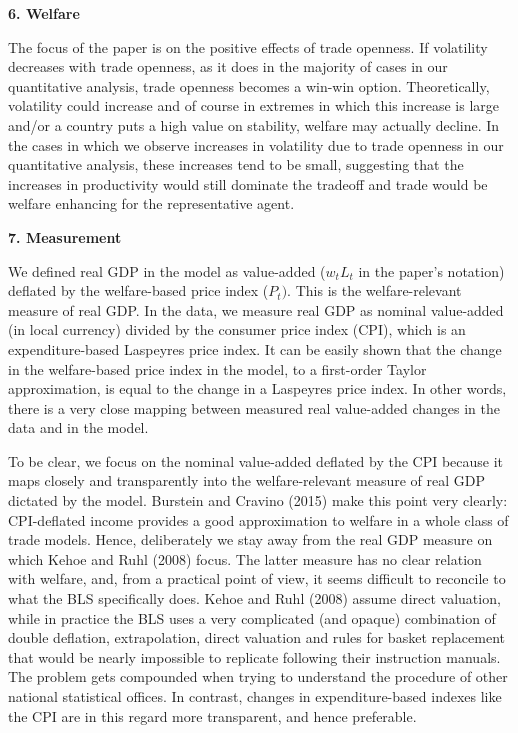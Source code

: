 \documentclass[12pt]{article}
\begin{document}
\textbf{6. Welfare}

The focus of the paper is on the positive effects of trade openness. If
volatility decreases with trade openness, as it does in the majority of
cases in our quantitative analysis, trade openness becomes a win-win option.
Theoretically, volatility could increase and of course in extremes in which
this increase is large and/or a country puts a high value on stability,
welfare may actually decline. In the cases in which we observe increases in
volatility due to trade openness in our quantitative analysis, these
increases tend to be small, suggesting that the increases in productivity
would still dominate the tradeoff and trade would be welfare enhancing for
the representative agent.\bigskip

\textbf{7. Measurement}

We defined real GDP in the model as value-added ($w_{t}L_{t}$ in the paper's
notation) deflated by the welfare-based price index ($P_{t})$. This is the
welfare-relevant measure of real GDP. In the data, we measure real GDP as
nominal value-added (in local currency) divided by the consumer price index
(CPI), which is an expenditure-based Laspeyres price index. It can be easily
shown that the change in the welfare-based price index in the model, to a
first-order Taylor approximation, is equal to the change in a Laspeyres
price index. In other words, there is a very close mapping between measured
real value-added changes in the data and in the model.

To be clear, we focus on the nominal value-added deflated by the CPI because
it maps closely and transparently into the welfare-relevant measure of real
GDP dictated by the model. Burstein and Cravino (2015) make this point very
clearly: CPI-deflated income provides a good approximation to welfare in a
whole class of trade models. Hence, deliberately we stay away from the real
GDP measure on which Kehoe and Ruhl (2008) focus. The latter measure has no
clear relation with welfare, and, from a practical point of view, it seems
difficult to reconcile to what the BLS specifically does. Kehoe and Ruhl
(2008) assume direct valuation, while in practice the BLS uses a very
complicated (and opaque) combination of double deflation, extrapolation,
direct valuation and rules for basket replacement that would be nearly
impossible to replicate following their instruction manuals. The problem
gets compounded when trying to understand the procedure of other national
statistical offices. In contrast, changes in expenditure-based indexes like
the CPI are in this regard more transparent, and hence preferable.
\end{document}
